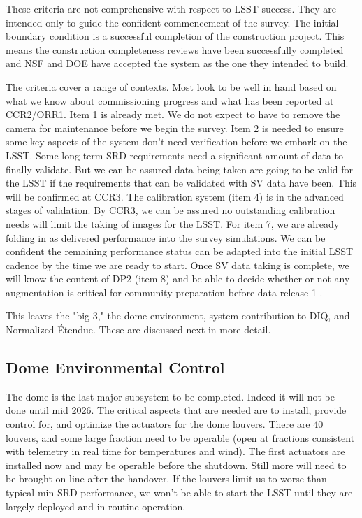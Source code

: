 These criteria are not comprehensive with respect to LSST success. They are intended only to guide the confident commencement of the survey. The initial boundary condition is a successful completion of the construction project. This means the construction completeness reviews have been successfully completed and NSF and DOE have accepted the system as the one they intended to build.

The criteria cover a range of contexts. Most look to be well in hand based on what we know about commissioning progress and what has been reported at CCR2/ORR1. Item 1 is already met. We do not expect to have to remove the camera for maintenance before we begin the survey. Item 2 is needed to ensure some key aspects of the system don't need verification before we embark on the LSST. Some long term SRD requirements need a significant amount of data to finally validate. But we can be assured data being taken are going to be valid for the LSST if the requirements that can be validated with SV data have been. This will be confirmed at CCR3. The calibration system (item 4)  is in the advanced stages of validation. By CCR3, we can be assured no outstanding calibration needs will limit the taking of images for the LSST. For item 7, we are already folding in as delivered performance into the survey simulations. We can be confident the remaining performance status can be adapted into the initial LSST cadence by the time we are ready to start. Once SV data taking is complete, we will know the content of DP2 (item 8) and be able to decide whether or not any augmentation is critical for community preparation before data release 1 \citep[DR1; see][]{RTN-011}. 

This leaves the "big 3," the dome environment, system contribution to DIQ, and Normalized \'{E}tendue. These are discussed next in more detail.

\subsection{Dome Environmental Control}
The dome is the last major subsystem to be completed. Indeed it will not be done until mid 2026. The critical aspects that are needed are to install, provide control for, and optimize the actuators for the dome louvers. There are 40 louvers, and some large fraction need to be operable (open at fractions consistent with telemetry in real time for temperatures and wind). The first actuators are installed now and may be operable before the shutdown. Still more will need to be brought on line after the handover. If the louvers limit us to worse than typical min SRD performance, we won't be able to start the LSST until they are largely deployed and in routine operation. 

